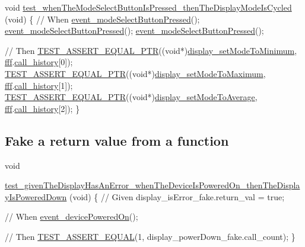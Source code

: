 \begin{DoxyCode}
\textcolor{keywordtype}{void}
\hyperlink{test__event__processor_8c_ae77b983df3ecc38c9338c8a1c1747199}{test\_whenTheModeSelectButtonIsPressed\_thenTheDisplayModeIsCycled}
      (\textcolor{keywordtype}{void})
\{
    \textcolor{comment}{// When}
    \hyperlink{event__processor_8c_aea6c21cc8520a67d644f5eee64e266a9}{event\_modeSelectButtonPressed}();
    \hyperlink{event__processor_8c_aea6c21cc8520a67d644f5eee64e266a9}{event\_modeSelectButtonPressed}();
    \hyperlink{event__processor_8c_aea6c21cc8520a67d644f5eee64e266a9}{event\_modeSelectButtonPressed}();

    \textcolor{comment}{// Then}
    \hyperlink{unity_8h_a765240c346d79b58ef22d81982aced18}{TEST\_ASSERT\_EQUAL\_PTR}((\textcolor{keywordtype}{void}*)\hyperlink{display_8h_a4f4309083204c27565cd4943c558bf35}{display\_setModeToMinimum}, 
      \hyperlink{fff_8h_a17556823cf79cfed8036143c73ff0b36}{fff}.\hyperlink{structfff__globals__t_a94081826ed0bed160e35607052964374}{call\_history}[0]);
    \hyperlink{unity_8h_a765240c346d79b58ef22d81982aced18}{TEST\_ASSERT\_EQUAL\_PTR}((\textcolor{keywordtype}{void}*)\hyperlink{display_8h_a3ecd07af6041cf61b0c60150b5866c84}{display\_setModeToMaximum}, 
      \hyperlink{fff_8h_a17556823cf79cfed8036143c73ff0b36}{fff}.\hyperlink{structfff__globals__t_a94081826ed0bed160e35607052964374}{call\_history}[1]);
    \hyperlink{unity_8h_a765240c346d79b58ef22d81982aced18}{TEST\_ASSERT\_EQUAL\_PTR}((\textcolor{keywordtype}{void}*)\hyperlink{display_8h_a80fe0f40254a3d87f017e7d4a3a75de4}{display\_setModeToAverage}, 
      \hyperlink{fff_8h_a17556823cf79cfed8036143c73ff0b36}{fff}.\hyperlink{structfff__globals__t_a94081826ed0bed160e35607052964374}{call\_history}[2]);
\}
\end{DoxyCode}


\subsection*{Fake a return value from a function}


\begin{DoxyCode}
\textcolor{keywordtype}{void}

      \hyperlink{test__event__processor_8c_aaade2183eab43ecade551f4ce2710653}{test\_givenTheDisplayHasAnError\_whenTheDeviceIsPoweredOn\_thenTheDisplayIsPoweredDown}
      (\textcolor{keywordtype}{void})
\{
    \textcolor{comment}{// Given}
    display\_isError\_fake.return\_val = \textcolor{keyword}{true};

    \textcolor{comment}{// When}
    \hyperlink{event__processor_8c_a07ad329255bf724d42e83d7288b20905}{event\_devicePoweredOn}();

    \textcolor{comment}{// Then}
    \hyperlink{unity_8h_af9e5695d6c7cf634206ea6d062cb54c9}{TEST\_ASSERT\_EQUAL}(1, display\_powerDown\_fake.call\_count);
\}
\end{DoxyCode}


